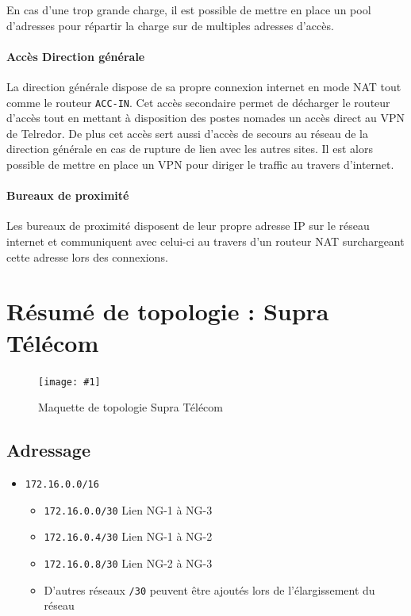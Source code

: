 \documentclass{article}
\newenvironment{figue}[1]{
	\par
	\bigskip
	\begin{figure}[h]
	\begin{center}
	  \texttt{[image: \#1]}
	\end{center}
}{
	\end{figure}
	\bigskip
}
\newcommand{\tlr}{Telredor\xspace}
\newcommand{\spr}{Supra Télécom\xspace}
\begin{document}
En cas d'une trop grande charge, il est possible de mettre en place un pool d'adresses pour répartir la charge sur de multiples adresses d'accès.

\paragraph{Accès Direction générale}
La direction générale dispose de sa propre connexion internet en mode NAT tout comme le routeur \texttt{ACC-IN}.
Cet accès secondaire permet de décharger le routeur d'accès tout en mettant à disposition des postes nomades un accès direct au VPN de \tlr.
De plus cet accès sert aussi d'accès de secours au réseau de la direction générale en cas de rupture de lien avec les autres sites. Il est alors possible de mettre en place un VPN pour diriger le traffic au travers d'internet.

\paragraph{Bureaux de proximité} Les bureaux de proximité disposent de leur propre adresse IP sur le réseau internet et communiquent avec celui-ci au travers d'un routeur NAT surchargeant cette adresse lors des connexions.

\clearpage
\section{Résumé de topologie : \spr}

\begin{figue}{img/nuage-supra.pdf}
	\caption{Maquette de topologie \spr}
\end{figue}

\subsection{Adressage}

\begin{itemize}
	\item \texttt{172.16.0.0/16}
	\begin{itemize}
		\item \texttt{172.16.0.0/30} Lien NG-1 à NG-3
		\item \texttt{172.16.0.4/30} Lien NG-1 à NG-2
		\item \texttt{172.16.0.8/30} Lien NG-2 à NG-3
		\item D'autres réseaux \texttt{/30} peuvent être ajoutés lors de l'élargissement du réseau
	\end{itemize}
\end{itemize}
\end{document}
